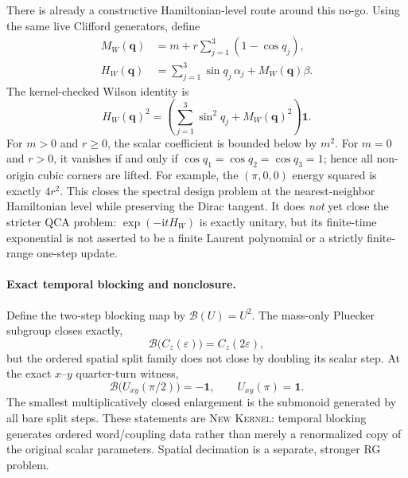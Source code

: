 \documentclass[11pt]{article}
\newcommand{\Kernel}{\textcolor{kernelcolor}{\textsc{Kernel}}}
\newcommand{\NewResult}{\textsc{New}}
\newcommand{\ii}{\mathrm{i}}
\newcommand{\id}{\mathbf{1}}
\begin{document}
There is already a constructive Hamiltonian-level route around this no-go.
Using the same live Clifford generators, define
\begin{align}
 M_W(\mathbf q)&=m+r\sum_{j=1}^{3}(1-\cos q_j),\\
 H_W(\mathbf q)&=\sum_{j=1}^{3}\sin q_j\,\alpha_j+M_W(\mathbf q)\beta.
\end{align}
The kernel-checked Wilson identity is
\begin{equation}\label{eq:wilsonsquare}
 H_W(\mathbf q)^2=
 \left(\sum_{j=1}^{3}\sin^2q_j+M_W(\mathbf q)^2\right)\id.
\end{equation}
For $m>0$ and $r\geq0$, the scalar coefficient is bounded below by $m^2$.
For $m=0$ and $r>0$, it vanishes if and only if
$\cos q_1=\cos q_2=\cos q_3=1$; hence all non-origin cubic corners are lifted.
For example, the $(\pi,0,0)$ energy squared is exactly $4r^2$.  This closes
the spectral design problem at the nearest-neighbor Hamiltonian level while
preserving the Dirac tangent.  It does \emph{not} yet close the stricter QCA
problem: $\exp(-\ii tH_W)$ is exactly unitary, but its finite-time exponential
is not asserted to be a finite Laurent polynomial or a strictly finite-range
one-step update.

\paragraph{Exact temporal blocking and nonclosure.}
Define the two-step blocking map by $\mathcal B(U)=U^2$.  The mass-only
Pluecker subgroup closes exactly,
\[
 \mathcal B\bigl(C_z(\varepsilon)\bigr)=C_z(2\varepsilon),
\]
but the ordered spatial split family does not close by doubling its scalar
step.  At the exact $x$--$y$ quarter-turn witness,
\begin{equation}\label{eq:rgcounterexample}
 \mathcal B\bigl(U_{xy}(\pi/2)\bigr)=-\id,
 \qquad U_{xy}(\pi)=\id.
\end{equation}
The smallest multiplicatively closed enlargement is the submonoid generated
by all bare split steps.  These statements are \NewResult{} \Kernel{}: temporal
blocking generates ordered word/coupling data rather than merely a
renormalized copy of the original scalar parameters.  Spatial decimation is a
separate, stronger RG problem.
\end{document}
